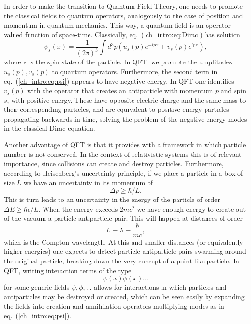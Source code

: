 In order to make the transition to Quantum Field Theory, one needs to promote the classical fields to quantum operators, analogously to the case of position and momentum in quantum mechanics. This way, a quantum field is an operator valued function of space-time. Classically, eq.~(\ref{ch_intro:eq:Dirac}) has solution
\begin{equation}
\label{ch_intro:eq:psi}
\psi_s(x)=\frac{1}{(2\pi)^3}\int d^3p\left(u_s(p)e^{-ipx}+v_s(p)e^{ipx}\right),
\end{equation}
where $s$ is the spin state of the particle. In QFT, we promote the amplitudes $u_s(p),v_s(p)$ to quantum operators. Furthermore, the second term in eq.~(\ref{ch_intro:eq:psi}) appears to have negative energy. In QFT one identifies $v_s(p)$ with the operator that creates an antiparticle with momentum $p$ and spin $s$, with positive energy. These have opposite electric charge and the same mass to their corresponding particles, and are equivalent to positive energy particles propagating backwards in time, solving the problem of the negative energy modes in the classical Dirac equation.

Another advantage of QFT is that it provides with a framework in which particle number is not conserved. In the context of relativistic systems this is of relevant importance, since collisions can create and destroy particles. Furthermore, according to Heisenberg's uncertainty principle, if we place a particle in a box of size $L$ we have an uncertainty in its momentum of
\begin{equation}
\Delta p\geq\hbar/L.
\end{equation}
This is turn leads to an uncertainty in the energy of the particle of order $\Delta E\geq\hbar c/L$. When the energy exceeds $2mc^2$ we have enough energy to create out of the vacuum a particle-antiparticle pair. This will happen at distances of order 
\begin{equation}
L=\lambda=\frac{\hbar}{mc},
\end{equation}
which is the Compton wavelength. At this and smaller distances (or equivalently higher energies) one expects to detect particle-antiparticle pairs swarming around the original particle, breaking down the very concept of a point-like particle. In QFT, writing interaction terms of the type
\begin{equation}
\psi(x)\phi(x)...
\end{equation}
for some generic fields $\psi,\phi,...$ allows for interactions in which particles and antiparticles may be destroyed or created, which can be seen easily by expanding the fields into creation and annihilation operators multiplying modes as in eq.~(\ref{ch_intro:eq:psi}).

